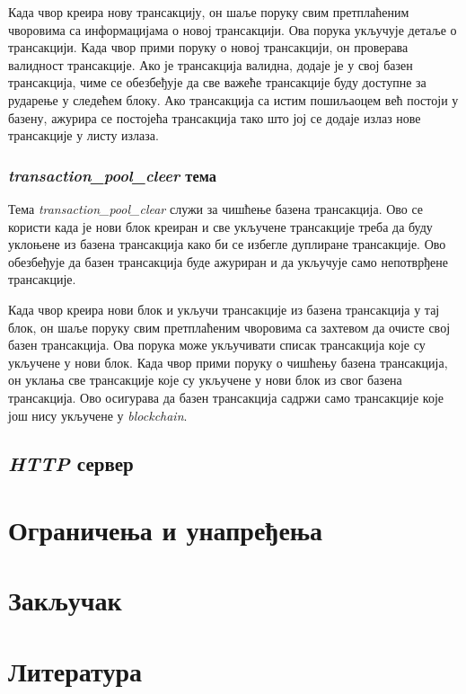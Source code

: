 \documentclass[12pt, a4paper]{article}
\begin{document}
Када чвор креира нову трансакцију, он шаље поруку свим претплаћеним чворовима са информацијама о новој трансакцији. Ова порука укључује детаље о трансакцији. Када чвор прими поруку о новој трансакцији, он проверава валидност трансакције. Ако је трансакција валидна, додаје је у свој базен трансакција, чиме се обезбеђује да све важеће трансакције буду доступне за рударење у следећем блоку. Ако трансакција са истим пошиљаоцем већ постоји у базену, ажурира се постојећа трансакција тако што јој се додаје излаз нове трансакције у листу излаза.


\subsubsection{\textbf{\textit{transaction\_pool\_cleer}} тема}
Тема \textit{transaction\_pool\_clear} служи за чишћење базена трансакција. Ово се користи када је нови блок креиран и све укључене трансакције треба да буду уклоњене из базена трансакција како би се избегле дуплиране трансакције. Ово обезбеђује да базен трансакција буде ажуриран и да укључује само непотврђене трансакције.

Када чвор креира нови блок и укључи трансакције из базена трансакција у тај блок, он шаље поруку свим претплаћеним чворовима са захтевом да очисте свој базен трансакција. Ова порука може укључивати списак трансакција које су укључене у нови блок.
Када чвор прими поруку о чишћењу базена трансакција, он уклања све трансакције које су укључене у нови блок из свог базена трансакција. Ово осигурава да базен трансакција садржи само трансакције које још нису укључене у \textit{blockchain}.
\newpage
\subsection{\textit{HTTP} сервер}
\newpage
\section{Ограничења и унапређења}
\newpage
\section{Закључак}



\pagebreak
\section{Литература}
\renewcommand{\refname}{}
\vspace{-\parskip} %
\vspace{-\parskip} %
\vspace{-\parskip} %
\vspace{-\parskip} %

\end{document}
